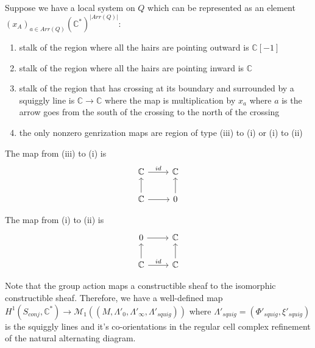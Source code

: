 \begin{definition}
Suppose we have a local system on $Q$ which can be represented as an element $(x_A)_{a\in Arr(Q)}(\mathbb{C}^*)^{|Arr(Q)|}$:

\begin{enumerate}[label= (\roman*)]
\item stalk of the region where all the hairs are pointing outward is $\mathbb{C}[-1]$

\item stalk of the region where all the hairs are pointing inward is $\mathbb{C}$

\item stalk of the region that has crossing at its boundary and surrounded by a squiggly line is $\mathbb{C}\rightarrow\mathbb{C}$ where the map is multiplication by $x_a$ where $a$ is the arrow goes from the south of the crossing to the north of the crossing

\item the only nonzero genrization maps are region of type (\Rn{3}) to (\Rn{1}) or (\Rn{1}) to (\Rn{2})
\end{enumerate}

The map from (\Rn{3}) to (\Rn{1}) is
\[
  \begin{tikzcd}
    \mathbb{C} \arrow{r}{id} & \mathbb{C} \\
    \mathbb{C}\arrow{u}{} \arrow{r}{}& 0\arrow{u}{}
  \end{tikzcd}
\]

The map from (\Rn{1}) to (\Rn{2}) is 
\[
  \begin{tikzcd}
	0 \arrow{r}{} & \mathbb{C} \\
    \mathbb{C}\arrow{u}{} \arrow{r}{id}& \mathbb{C}\arrow{u}{}
  \end{tikzcd}
\]
\end{definition}

Note that the group action maps a constructible sheaf to the isomorphic constructible sheaf. Therefore, we have a well-defined map
$H^1(S_{conj},\mathbb{C}^*)\rightarrow \mathcal{M}_1((M,\Lambda'_0,\Lambda'_\infty, \Lambda'_{squig}))$ where $\Lambda'_{squig} = (\Phi'_{squig}, \xi'_{squig})$ is the squiggly lines and it's co-orientations in the regular cell complex refinement of the natural alternating diagram.